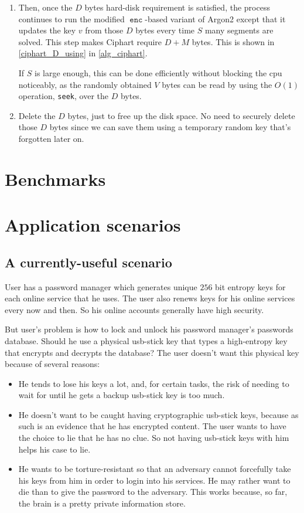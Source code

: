 \documentclass[twocolumn]{article}
\DeclareMathOperator{\enc}{\mathtt{enc}}
\begin{document}
\begin{enumerate}
    \item Then, once the $D$ bytes hard-disk requirement is satisfied, the
    process continues to run the modified $\enc$-based variant of
    Argon2 except that it updates the key $v$ from those $D$ bytes
    every time $S$ many segments are solved.  This step makes
    Ciphart require $D+M$ bytes.  This is shown in
    \cref{ciphart_D_using} in \cref{alg_ciphart}.

    If $S$ is large enough, this can be done efficiently without blocking
    the cpu noticeably, as the randomly obtained $V$ bytes can be read by
    using the $O(1)$ operation, \texttt{seek}, over the $D$ bytes.

    \item Delete the $D$ bytes, just to free up the disk space.  No need to
    securely delete those $D$ bytes since we can save them using a
    temporary random key that's forgotten later on.
\end{enumerate}

\section{Benchmarks}

\section{Application scenarios}
\subsection{A currently-useful scenario}
User has a password manager which generates unique $256$ bit entropy keys for
each online service that he uses.  The user also renews keys for his online
services every now and then.   So his online accounts generally have high
security.

But user's problem is how to lock and unlock his password manager's
passwords database.  Should he use a physical usb-stick key that types a
high-entropy key that encrypts and decrypts the database?   The user
doesn't want this physical key because of several reasons:
\begin{itemize}
    \item He tends to lose his keys a lot, and, for certain tasks, the risk
    of needing to wait for until he gets a backup usb-stick key is too
    much.

    \item He doesn't want to be caught having cryptographic usb-stick keys,
    because as such is an evidence that he has encrypted content.  The user
    wants to have the choice to lie that he has no clue.  So not having
    usb-stick keys with him helps his case to lie.

    \item He wants to be torture-resistant so that an adversary cannot
    forcefully take his keys from him in order to login into his services.
    He may rather want to die than to give the password to the adversary.
    This works because, so far, the brain is a pretty private information
    store.
\end{itemize}
\end{document}
